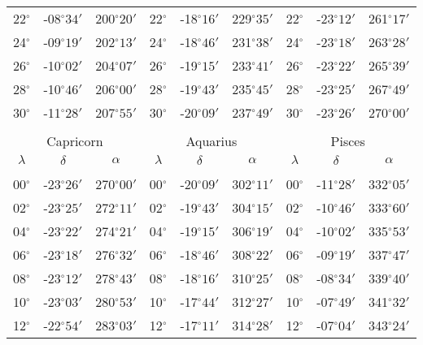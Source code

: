 \begin{table}
\begin{tabular}{ccc|ccc|ccc}
22$^\circ$ & -08$^\circ$$34'$ & 200$^\circ$$20'$ & 22$^\circ$ & -18$^\circ$$16'$ & 229$^\circ$$35'$ & 22$^\circ$ & -23$^\circ$$12'$ & 261$^\circ$$17'$\\
24$^\circ$ & -09$^\circ$$19'$ & 202$^\circ$$13'$ & 24$^\circ$ & -18$^\circ$$46'$ & 231$^\circ$$38'$ & 24$^\circ$ & -23$^\circ$$18'$ & 263$^\circ$$28'$\\
26$^\circ$ & -10$^\circ$$02'$ & 204$^\circ$$07'$ & 26$^\circ$ & -19$^\circ$$15'$ & 233$^\circ$$41'$ & 26$^\circ$ & -23$^\circ$$22'$ & 265$^\circ$$39'$\\
28$^\circ$ & -10$^\circ$$46'$ & 206$^\circ$$00'$ & 28$^\circ$ & -19$^\circ$$43'$ & 235$^\circ$$45'$ & 28$^\circ$ & -23$^\circ$$25'$ & 267$^\circ$$49'$\\
30$^\circ$ & -11$^\circ$$28'$ & 207$^\circ$$55'$ & 30$^\circ$ & -20$^\circ$$09'$ & 237$^\circ$$49'$ & 30$^\circ$ & -23$^\circ$$26'$ & 270$^\circ$$00'$\\
\multicolumn{9}{c}{}\\
\multicolumn{3}{c}{Capricorn}\vline & \multicolumn{3}{c}{Aquarius} \vline& \multicolumn{3}{c}{Pisces}\\\hline
$\lambda$& $\delta$& $\alpha$& $\lambda$& $\delta$& $\alpha$& $\lambda$& $\delta$& $\alpha$\\\hline
&&&&&&&&\\[-2ex]
00$^\circ$ & -23$^\circ$$26'$ & 270$^\circ$$00'$ & 00$^\circ$ & -20$^\circ$$09'$ & 302$^\circ$$11'$ & 00$^\circ$ & -11$^\circ$$28'$ & 332$^\circ$$05'$\\
02$^\circ$ & -23$^\circ$$25'$ & 272$^\circ$$11'$ & 02$^\circ$ & -19$^\circ$$43'$ & 304$^\circ$$15'$ & 02$^\circ$ & -10$^\circ$$46'$ & 333$^\circ$$60'$\\
04$^\circ$ & -23$^\circ$$22'$ & 274$^\circ$$21'$ & 04$^\circ$ & -19$^\circ$$15'$ & 306$^\circ$$19'$ & 04$^\circ$ & -10$^\circ$$02'$ & 335$^\circ$$53'$\\
06$^\circ$ & -23$^\circ$$18'$ & 276$^\circ$$32'$ & 06$^\circ$ & -18$^\circ$$46'$ & 308$^\circ$$22'$ & 06$^\circ$ & -09$^\circ$$19'$ & 337$^\circ$$47'$\\
08$^\circ$ & -23$^\circ$$12'$ & 278$^\circ$$43'$ & 08$^\circ$ & -18$^\circ$$16'$ & 310$^\circ$$25'$ & 08$^\circ$ & -08$^\circ$$34'$ & 339$^\circ$$40'$\\
10$^\circ$ & -23$^\circ$$03'$ & 280$^\circ$$53'$ & 10$^\circ$ & -17$^\circ$$44'$ & 312$^\circ$$27'$ & 10$^\circ$ & -07$^\circ$$49'$ & 341$^\circ$$32'$\\
12$^\circ$ & -22$^\circ$$54'$ & 283$^\circ$$03'$ & 12$^\circ$ & -17$^\circ$$11'$ & 314$^\circ$$28'$ & 12$^\circ$ & -07$^\circ$$04'$ & 343$^\circ$$24'$\\

\end{tabular}
\end{table}
